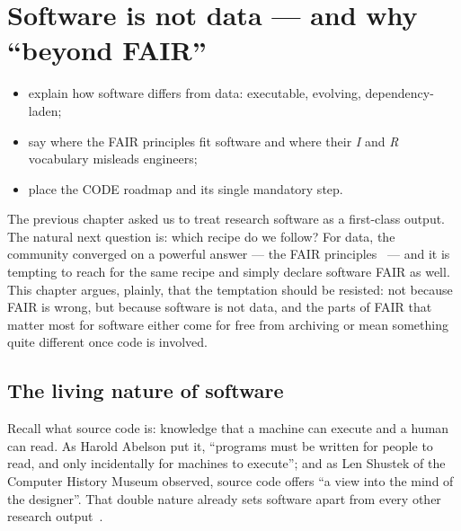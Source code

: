 \chapter{Software is not data --- and why ``beyond FAIR''}
\label{ch:beyond-fair}


\begin{objectives}\small
\begin{itemize}[nosep,leftmargin=*]
  \item explain how software differs from data: executable, evolving, dependency-laden;
  \item say where the FAIR principles fit software and where their \emph{I} and \emph{R}
        vocabulary misleads engineers;
  \item place the CODE roadmap and its single mandatory step.
\end{itemize}
\end{objectives}

The previous chapter asked us to treat research software as a first-class output. The natural
next question is: which recipe do we follow? For data, the community converged on a powerful
answer --- the FAIR principles~\autocite{fairdefinition2016} --- and it is tempting to reach for
the same recipe and simply declare software FAIR as well. This chapter argues, plainly, that the
temptation should be resisted: not because FAIR is wrong, but because software is not data, and
the parts of FAIR that matter most for software either come for free from archiving or mean
something quite different once code is involved.

\section{The living nature of software}

Recall what source code is: knowledge that a machine can execute and a human can read. As Harold
Abelson put it, \enquote{programs must be written for people to read, and only incidentally for
machines to execute}; and as Len Shustek of the Computer History Museum observed, source code
offers \enquote{a view into the mind of the designer}. That double nature already sets software
apart from every other research output~\autocite{SwhCACM2018}.

